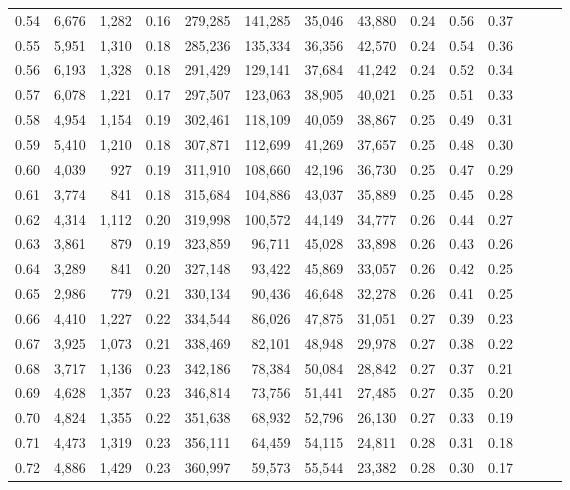 \begin{tabular}{rrrrrrrrrrrrrr}
0.54 &  6,676 &  1,282 &  0.16 &  279,285 &  141,285 &  35,046 &  43,880 &  0.24 &  0.56 &      0.37 \\
0.55 &  5,951 &  1,310 &  0.18 &  285,236 &  135,334 &  36,356 &  42,570 &  0.24 &  0.54 &      0.36 \\
0.56 &  6,193 &  1,328 &  0.18 &  291,429 &  129,141 &  37,684 &  41,242 &  0.24 &  0.52 &      0.34 \\
0.57 &  6,078 &  1,221 &  0.17 &  297,507 &  123,063 &  38,905 &  40,021 &  0.25 &  0.51 &      0.33 \\
0.58 &  4,954 &  1,154 &  0.19 &  302,461 &  118,109 &  40,059 &  38,867 &  0.25 &  0.49 &      0.31 \\
0.59 &  5,410 &  1,210 &  0.18 &  307,871 &  112,699 &  41,269 &  37,657 &  0.25 &  0.48 &      0.30 \\
0.60 &  4,039 &    927 &  0.19 &  311,910 &  108,660 &  42,196 &  36,730 &  0.25 &  0.47 &      0.29 \\
0.61 &  3,774 &    841 &  0.18 &  315,684 &  104,886 &  43,037 &  35,889 &  0.25 &  0.45 &      0.28 \\
0.62 &  4,314 &  1,112 &  0.20 &  319,998 &  100,572 &  44,149 &  34,777 &  0.26 &  0.44 &      0.27 \\
0.63 &  3,861 &    879 &  0.19 &  323,859 &   96,711 &  45,028 &  33,898 &  0.26 &  0.43 &      0.26 \\
0.64 &  3,289 &    841 &  0.20 &  327,148 &   93,422 &  45,869 &  33,057 &  0.26 &  0.42 &      0.25 \\
0.65 &  2,986 &    779 &  0.21 &  330,134 &   90,436 &  46,648 &  32,278 &  0.26 &  0.41 &      0.25 \\
0.66 &  4,410 &  1,227 &  0.22 &  334,544 &   86,026 &  47,875 &  31,051 &  0.27 &  0.39 &      0.23 \\
0.67 &  3,925 &  1,073 &  0.21 &  338,469 &   82,101 &  48,948 &  29,978 &  0.27 &  0.38 &      0.22 \\
0.68 &  3,717 &  1,136 &  0.23 &  342,186 &   78,384 &  50,084 &  28,842 &  0.27 &  0.37 &      0.21 \\
0.69 &  4,628 &  1,357 &  0.23 &  346,814 &   73,756 &  51,441 &  27,485 &  0.27 &  0.35 &      0.20 \\
0.70 &  4,824 &  1,355 &  0.22 &  351,638 &   68,932 &  52,796 &  26,130 &  0.27 &  0.33 &      0.19 \\
0.71 &  4,473 &  1,319 &  0.23 &  356,111 &   64,459 &  54,115 &  24,811 &  0.28 &  0.31 &      0.18 \\
0.72 &  4,886 &  1,429 &  0.23 &  360,997 &   59,573 &  55,544 &  23,382 &  0.28 &  0.30 &      0.17 \\

\end{tabular}
